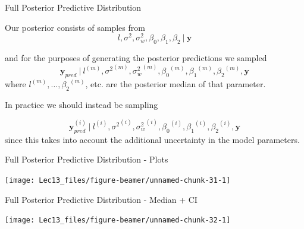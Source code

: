 \documentclass[11pt,ignorenonframetext,]{beamer}
\begin{document}
\begin{frame}[t]{Full Posterior Predictive Distribution}
\protect\hypertarget{full-posterior-predictive-distribution-1}{}

Our posterior consists of samples from
\[ l, \sigma^2, \sigma^2_w, \beta_0, \beta_1, \beta_2 ~|~ \symbf{y} \]

and for the purposes of generating the posterior predictions we sampled
\[ \symbf{y}_{pred} ~|~ l^{(m)}, {\sigma^2}^{(m)}, {\sigma^2_w}^{(m)}, {\beta_0}^{(m)}, {\beta_1}^{(m)}, {\beta_2}^{(m)}, \symbf{y} \]
where \(l^{(m)}, \ldots, {\beta_2}^{(m)}\), etc. are the posterior
median of that parameter.

\pause

\vspace{5mm}

In practice we should instead be sampling

\[ \symbf{y}^{(i)}_{pred} ~|~ l^{(i)}, {\sigma^2}^{(i)}, {\sigma^2_w}^{(i)}, {\beta_0}^{(i)}, {\beta_1}^{(i)}, {\beta_2}^{(i)}, \symbf{y} \]
since this takes into account the additional uncertainty in the model
parameters.

\end{frame}

\begin{frame}{Full Posterior Predictive Distribution - Plots}
\protect\hypertarget{full-posterior-predictive-distribution---plots}{}

\begin{center}\texttt{[image: Lec13\_files/figure-beamer/unnamed-chunk-31-1]} \end{center}

\end{frame}

\begin{frame}{Full Posterior Predictive Distribution - Median + CI}
\protect\hypertarget{full-posterior-predictive-distribution---median-ci}{}

\begin{center}\texttt{[image: Lec13\_files/figure-beamer/unnamed-chunk-32-1]} \end{center}

\end{frame}
\end{document}
